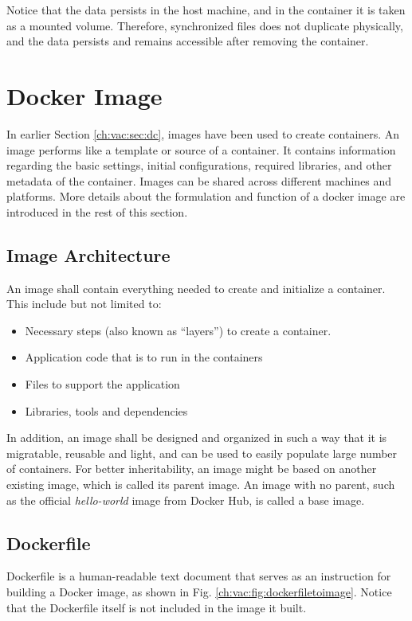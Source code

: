 Notice that the data persists in the host machine, and in the container it is taken as a mounted volume. Therefore, synchronized files does not duplicate physically, and the data persists and remains accessible after removing the container.

\section{Docker Image} \label{ch:vac:sec:di}

In earlier Section \ref{ch:vac:sec:dc}, images have been used to create containers. An image performs like a template or source of a container. It contains information regarding the basic settings, initial configurations, required libraries, and other metadata of the container. Images can be shared across different machines and platforms. More details about the formulation and function of a docker image are introduced in the rest of this section.

\subsection{Image Architecture}

An image shall contain everything needed to create and initialize a container. This include but not limited to:
\begin{itemize}
  \item Necessary steps (also known as ``layers'') to create a container.
  \item Application code that is to run in the containers
  \item Files to support the application
  \item Libraries, tools and dependencies
\end{itemize}
In addition, an image shall be designed and organized in such a way that it is migratable, reusable and light, and can be used to easily populate large number of containers. For better inheritability, an image might be based on another existing image, which is called its parent image. An image with no parent, such as the official \textit{hello-world} image from Docker Hub, is called a base image.

\subsection{Dockerfile}

Dockerfile is a human-readable text document that serves as an instruction for building a Docker image, as shown in Fig. \ref{ch:vac:fig:dockerfiletoimage}. Notice that the Dockerfile itself is not included in the image it built.

